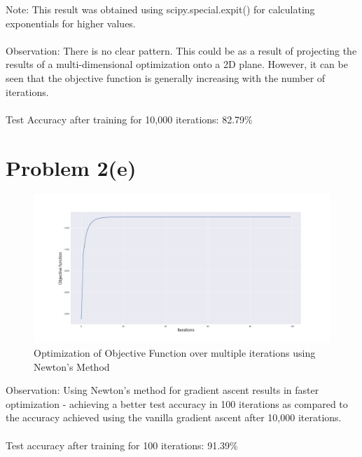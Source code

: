\documentclass[openany,11pt]{homework}
\begin{document}
Note: This result was obtained using scipy.special.expit() for calculating exponentials for higher values.
\\
\\
Observation: There is no clear pattern. This could be as a result of projecting the results of a multi-dimensional optimization onto a 2D plane. However, it can be seen that the objective function is generally increasing with the number of iterations.
\\
\\
Test Accuracy after training for 10,000 iterations: 82.79\%

\section*{Problem 2(e)}
\begin{figure}[h]
	\centering
	\includegraphics[width=\textwidth]{2e}
	\caption{Optimization of Objective Function over multiple iterations using Newton's Method}
\end{figure}

Observation: Using Newton's method for gradient ascent results in faster optimization - achieving a better test accuracy in 100 iterations as compared to the accuracy achieved using the vanilla gradient ascent after 10,000 iterations.
\\
\\
Test accuracy after training for 100 iterations: 91.39\%
\end{document}
